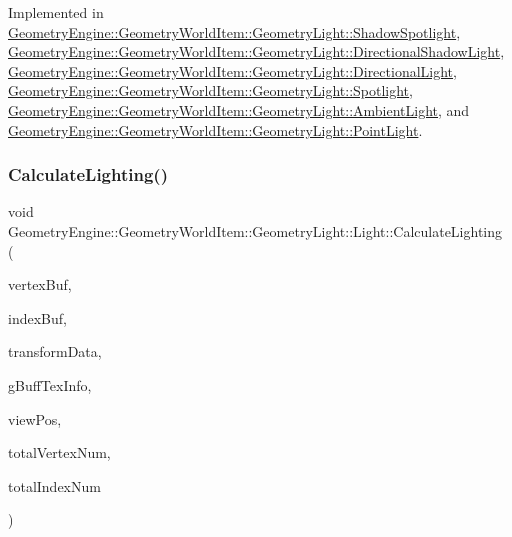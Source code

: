 Implemented in \mbox{\hyperlink{class_geometry_engine_1_1_geometry_world_item_1_1_geometry_light_1_1_shadow_spotlight_a27163f2f8903220d7eaae7aa70c9d6e6}{Geometry\+Engine\+::\+Geometry\+World\+Item\+::\+Geometry\+Light\+::\+Shadow\+Spotlight}}, \mbox{\hyperlink{class_geometry_engine_1_1_geometry_world_item_1_1_geometry_light_1_1_directional_shadow_light_a712d0b0a0573ebd246a4a8aa6b2b667a}{Geometry\+Engine\+::\+Geometry\+World\+Item\+::\+Geometry\+Light\+::\+Directional\+Shadow\+Light}}, \mbox{\hyperlink{class_geometry_engine_1_1_geometry_world_item_1_1_geometry_light_1_1_directional_light_af1eac6f1aac9388efe95e1a898cf600f}{Geometry\+Engine\+::\+Geometry\+World\+Item\+::\+Geometry\+Light\+::\+Directional\+Light}}, \mbox{\hyperlink{class_geometry_engine_1_1_geometry_world_item_1_1_geometry_light_1_1_spotlight_a6136ca2338a7b5f5be70ccab82fe655e}{Geometry\+Engine\+::\+Geometry\+World\+Item\+::\+Geometry\+Light\+::\+Spotlight}}, \mbox{\hyperlink{class_geometry_engine_1_1_geometry_world_item_1_1_geometry_light_1_1_ambient_light_a4f1d4fb9ad25626e15c28de03b610b4f}{Geometry\+Engine\+::\+Geometry\+World\+Item\+::\+Geometry\+Light\+::\+Ambient\+Light}}, and \mbox{\hyperlink{class_geometry_engine_1_1_geometry_world_item_1_1_geometry_light_1_1_point_light_aa30244fd20e61fdfe1ac1d85c99fd154}{Geometry\+Engine\+::\+Geometry\+World\+Item\+::\+Geometry\+Light\+::\+Point\+Light}}.

\mbox{\label{class_geometry_engine_1_1_geometry_world_item_1_1_geometry_light_1_1_light_a4a133e49941a68ac8c33f757e687c8b7}} 
\subsubsection{\texorpdfstring{CalculateLighting()}{CalculateLighting()}}
{\footnotesize\ttfamily void Geometry\+Engine\+::\+Geometry\+World\+Item\+::\+Geometry\+Light\+::\+Light\+::\+Calculate\+Lighting (\begin{DoxyParamCaption}\item[{Q\+Open\+G\+L\+Buffer $\ast$}]{vertex\+Buf,  }\item[{Q\+Open\+G\+L\+Buffer $\ast$}]{index\+Buf,  }\item[{const \mbox{\hyperlink{class_geometry_engine_1_1_lighting_transformation_data}{Lighting\+Transformation\+Data}} \&}]{transform\+Data,  }\item[{const \mbox{\hyperlink{class_geometry_engine_1_1_g_buffer_texture_info}{G\+Buffer\+Texture\+Info}} \&}]{g\+Buff\+Tex\+Info,  }\item[{const Q\+Vector3D \&}]{view\+Pos,  }\item[{unsigned int}]{total\+Vertex\+Num,  }\item[{unsigned int}]{total\+Index\+Num }\end{DoxyParamCaption})\hspace{0.3cm}{\ttfamily [virtual]}}

